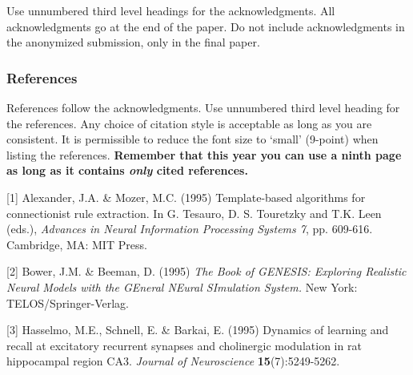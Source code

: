 \documentclass{article} %
\begin{document}
Use unnumbered third level headings for the acknowledgments. All
acknowledgments go at the end of the paper. Do not include 
acknowledgments in the anonymized submission, only in the 
final paper. 

\subsubsection*{References}

References follow the acknowledgments. Use unnumbered third level heading for
the references. Any choice of citation style is acceptable as long as you are
consistent. It is permissible to reduce the font size to `small' (9-point) 
when listing the references. {\bf Remember that this year you can use
a ninth page as long as it contains \emph{only} cited references.}

\small{
[1] Alexander, J.A. \& Mozer, M.C. (1995) Template-based algorithms
for connectionist rule extraction. In G. Tesauro, D. S. Touretzky
and T.K. Leen (eds.), {\it Advances in Neural Information Processing
Systems 7}, pp. 609-616. Cambridge, MA: MIT Press.

[2] Bower, J.M. \& Beeman, D. (1995) {\it The Book of GENESIS: Exploring
Realistic Neural Models with the GEneral NEural SImulation System.}
New York: TELOS/Springer-Verlag.

[3] Hasselmo, M.E., Schnell, E. \& Barkai, E. (1995) Dynamics of learning
and recall at excitatory recurrent synapses and cholinergic modulation
in rat hippocampal region CA3. {\it Journal of Neuroscience}
{\bf 15}(7):5249-5262.
}
\end{document}
